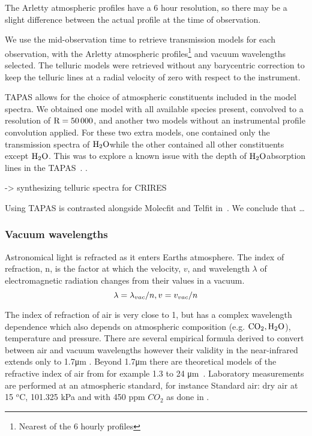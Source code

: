 The Arletty atmospheric profiles have a 6 hour resolution, so there may be a slight difference between the actual profile at the time of observation.

We use the mid-observation time to retrieve transmission models for each observation, with the Arletty atmospheric profiles\footnote{Nearest of the 6 hourly profiles} and vacuum wavelengths selected. The telluric models were retrieved without any barycentric correction to keep the telluric lines at a radial velocity of zero with respect to the instrument.

TAPAS allows for the choice of atmospheric constituents included in the model spectra. We obtained one model with all available species present, convolved to a resolution of \(\rm R=50\,000\), and another two models without an instrumental profile convolution applied. For these two extra models, one contained only the transmission spectra of \(\rm H_{2}O\)while the other contained all other constituents except \(\rm H_{2}O\). This was to explore a known issue with the depth of \(\rm H_{2}O\)absorption lines in the TAPAS~\citet{bertaux_tapas_2014}. .


 -> synthesizing telluric spectra \nir{} for CRIRES~\cite{seifahrt_synthesising_2010}

Using TAPAS is contrasted alongside Molecfit and Telfit in~\cite{ulmer-moll_telluric_2018}. We conclude that \ldots



\subsubsection{Vacuum wavelengths}

Astronomical light is refracted as it enters Earths atmosphere. The index of refraction, n, is the factor at which the velocity, \(v\), and wavelength \(\lambda\) of electromagnetic radiation changes from their values in a vacuum.
\[ \lambda = \lambda_{vac} / n, \vspace{1em} v = v_{vac}/n\]

The index of refraction of air is very close to 1, but has a complex wavelength dependence which also depends on atmospheric composition (e.g. \(\rm CO_2, H_2O\)), temperature and pressure. 
There are several empirical formula derived to convert between air and vacuum wavelengths \citep[e.g.][]{Edlen 1953, Peck and Reeder 1972, Ciddor 1996} however their validity in the near-infrared extends only to 1.7\si{\micro\meter} \citep{Ciddor1996}. Beyond 1.7\si{\micro\meter} there are theoretical models of the refractive index of air from for example 1.3 to 24 \si{\micro\meter}~\citet{mathar_refractive_2007}.  Laboratory measurements are performed at an atmospheric standard, for instance  Standard air: dry air at 15 \(^o\)C, 101.325 kPa and with 450 ppm \(CO_2\) as done in \citep{Ciddor1996} .


